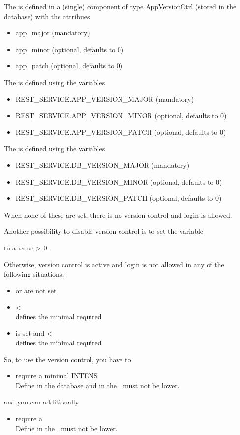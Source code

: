 The \DbVer{} is defined in a (single) component of type AppVersionCtrl (stored in the database)
with the attribues
\begin{itemize}
\item app\_major (mandatory)
\item app\_minor (optional, defaults to 0)
\item app\_patch (optional, defaults to 0)
\end{itemize}

The \AppVer{} is defined using the \DATAPOOL{} variables
\begin{itemize}
\item REST\_SERVICE.APP\_VERSION\_MAJOR (mandatory)
\item REST\_SERVICE.APP\_VERSION\_MINOR (optional, defaults to 0)
\item REST\_SERVICE.APP\_VERSION\_PATCH (optional, defaults to 0)
\end{itemize}

The \MinDbVer{} is defined using the \DATAPOOL{} variables
\begin{itemize}
\item REST\_SERVICE.DB\_VERSION\_MAJOR (mandatory)
\item REST\_SERVICE.DB\_VERSION\_MINOR (optional, defaults to 0)
\item REST\_SERVICE.DB\_VERSION\_PATCH (optional, defaults to 0)
\end{itemize}

When none of these are set, there is no version control and login is allowed.

Another possibility to disable version control is to set the \DATAPOOL{} variable

\RESTSERVICEDBVERSIONIGNORE{} to a value > 0.

Otherwise, version control is active and
login is not allowed in any of the following situations:
\begin{itemize}
\item \DbVer{} or \AppVer{} are not set
\item \AppVer{} < \DbVer{} \\
      \DbVer{} defines the minimal \AppVer{} required
\item \MinDbVer{} is set and \DbVer{} < \MinDbVer{} \\
      \MinDbVer{} defines the minimal \DbVer{} required
\end{itemize}

So, to use the version control, you have to
\begin{itemize}
\item require a minimal INTENS \AppVer{} \\
      Define \DbVer{} in the database and  \AppVer{} in the \DATAPOOL{}.
      \AppVer{} must not be lower.
\end{itemize}
and you can additionally
\begin{itemize}
\item require a \MinDbVer{} \\
      Define \MinDbVer{} in the \DATAPOOL{}. \DbVer{} must not be lower.
\end{itemize}

